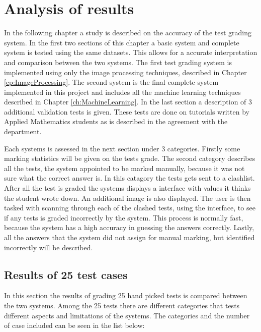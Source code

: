 \chapter{Analysis of results}
\label{ch:Results}
\ifpdf
\graphicspath{{Chapter5/Chapter5Figures/}}
\fi

In the following chapter a study is described on the accuracy of the test grading system. In the first two sections of this chapter a basic system and complete system is tested using the same datasets. This allows for a accurate interpretation and comparison between the two systems. The first test grading system is implemented using only the image processing techniques, described in Chapter \ref{cp:ImageProcessing}. The second system is the final complete system implemented in this project and includes all the machine learning techniques described in Chapter \ref{ch:MachineLearning}. In the last section a description of 3 additional validation tests is given. These tests are done on tutorials written by Applied Mathematics students as is described in the agreement with the department.

Each systems is assessed in the next section under 3 categories. Firstly some marking statistics will be given on the tests grade. The second category describes all the tests, the system appointed to be marked manually, because it was not sure what the correct answer is. In this catagory the tests gets sent to a clashlist. After all the test is graded the systems displays a interface with values it thinks the student wrote down. An additional image is also displayed. The user is then tasked with scanning through each of the clashed tests, using the interface, to see if any tests is graded incorrectly by the system. This process is normally fast, because the system has a high accuracy in guessing the answers correctly. Lastly, all the answers that the system did not assign for manual marking, but identified incorrectly will be described.

\section{Results of 25 test cases}

In this section the results of grading 25 hand picked tests is compared between the two systems. Among the 25 tests there are different categories that tests different aspects and limitations of the systems. The categories and the number of case included can be seen in the list below:


